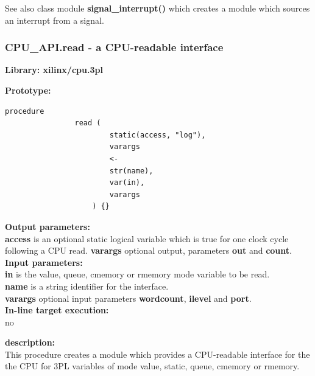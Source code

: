             See also class module {\bf signal\_interrupt()}
             which creates a module which sources an
            interrupt from a signal.





        \subsubsection{CPU\_API.read - a CPU-readable interface}\label{sec:lpcpurd}

            {\bf Library: xilinx/cpu.3pl}

            {\bf Prototype:} \\
            \vsp
            \begin{lstlisting}[gobble=12, language=threepl]
                procedure
                read (
                        static(access, "log"),
                        varargs
                        <- 
                        str(name),
                        var(in),
                        varargs
                    ) {}
            \end{lstlisting}

            {\bf Output parameters:} \\
            {\bf access} is an optional static logical variable which is true
            for one clock cycle following a CPU read.
            {\bf varargs} optional output, parameters {\bf out} and {\bf count}.\\

            {\bf Input parameters:} \\
            {\bf in} is the value, queue, cmemory or rmemory mode variable
            to be read.\\
            {\bf name} is a string identifier for the interface.\\
            {\bf varargs} optional input parameters {\bf wordcount}, {\bf ilevel} and
                {\bf port}.\\
        
            {\bf In-line target execution:} \\
            no

            {\bf description:} \\
            This procedure creates a module which provides a CPU-readable
            interface for the the CPU for  3PL variables of mode value, static,
            queue, cmemory or rmemory.
            

